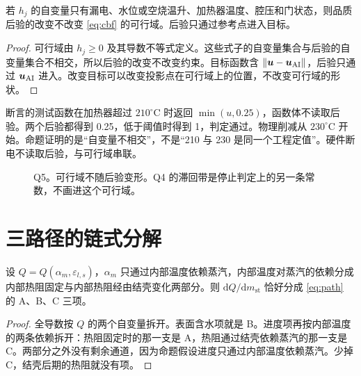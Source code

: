 \begin{proposition}[可行域与后验分离]
\label{prop:shield}
若 \(h_j\) 的自变量只有漏电、水位或空烧温升、加热器温度、腔压和门状态，则品质后验的改变不改变 \eqref{eq:cbf} 的可行域。后验只通过参考点进入目标。
\end{proposition}

\begin{proof}
可行域由 \(h_j\ge 0\) 及其导数不等式定义。这些式子的自变量集合与后验的自变量集合不相交，所以后验的改变不改变约束。目标函数含 \(\|\bm{u}-\bm{u}_{\mathrm{AI}}\|\)，后验只通过 \(\bm{u}_{\mathrm{AI}}\) 进入。改变目标可以改变投影点在可行域上的位置，不改变可行域的形状。
\end{proof}

断言的测试函数在加热器超过 \(210^\circ\mathrm{C}\) 时返回 \(\min(u,0.25)\)，函数体不读取后验。两个后验都得到 0.25，低于阈值时得到 1，判定通过。物理削减从 \(230^\circ\mathrm{C}\) 开始。命题证明的是“自变量不相交”，不是“210 与 230 是同一个工程定值”。硬件断电不读取后验，与可行域串联。

\begin{figure}[ht]
\centering
{}
\caption{Q5。可行域不随后验变形。Q4 的滞回带是停止判定上的另一条常数，不画进这个可行域。}
\end{figure}

\section{三路径的链式分解}

\begin{proposition}[路径可加]
\label{prop:path}
设 \(Q=Q(\alpha_m,\varepsilon_{l,s})\)，\(\alpha_m\) 只通过内部温度依赖蒸汽，内部温度对蒸汽的依赖分成内部热阻固定与内部热阻经由结壳变化两部分。则 \(\mathrm{d}Q/\mathrm{d}m_{\mathrm{st}}\) 恰好分成 \eqref{eq:path} 的 A、B、C 三项。
\end{proposition}

\begin{proof}
全导数按 \(Q\) 的两个自变量拆开。表面含水项就是 B。进度项再按内部温度的两条依赖拆开：热阻固定时的那一支是 A，热阻通过结壳依赖蒸汽的那一支是 C。两部分之外没有剩余通道，因为命题假设进度只通过内部温度依赖蒸汽。少掉 C，结壳后期的热阻就没有项。
\end{proof}

